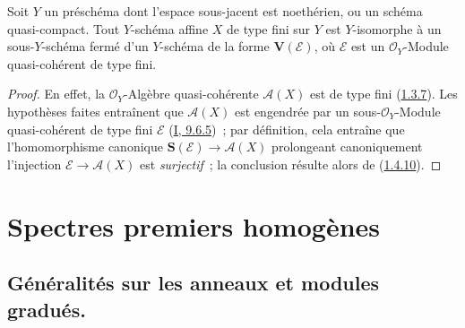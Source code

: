 \begin{proposition}[1.7.15]
\label{II.1.7.15-fr}
Soit $Y$ un préschéma dont l'espace sous-jacent est noethérien, ou un schéma
quasi-compact. Tout $Y$-schéma affine $X$ de type fini sur $Y$ est
$Y$-isomorphe à un sous-$Y$-schéma fermé d'un $Y$-schéma de la forme
$\mathbf{V}(\mathcal{E})$, où $\mathcal{E}$ est un $\mathcal{O}_Y$-Module
quasi-cohérent de type fini.
\end{proposition}

\begin{proof}
En effet, la $\mathcal{O}_Y$-Algèbre quasi-cohérente $\mathcal{A}(X)$ est de
type fini (\hyperref[II.1.3.7-fr]{1.3.7}). Les hypothèses faites entraînent
que $\mathcal{A}(X)$ est engendrée par un sous-$\mathcal{O}_Y$-Module
quasi-cohérent de type fini $\mathcal{E}$
(\hyperref[I.9.6.5-fr]{I, 9.6.5})~; par définition, cela entraîne que
l'homomorphisme canonique
$\mathbf{S}(\mathcal{E})\to\mathcal{A}(X)$ prolongeant canoniquement
l'injection $\mathcal{E}\to\mathcal{A}(X)$ est \emph{surjectif}~; la
conclusion résulte alors de (\hyperref[II.1.4.10-fr]{1.4.10}).
\end{proof}

\section{Spectres premiers homogènes}
\label{section:II.2-fr}

\subsection{Généralités sur les anneaux et modules gradués.}
\label{subsection:II.2.1-fr}

